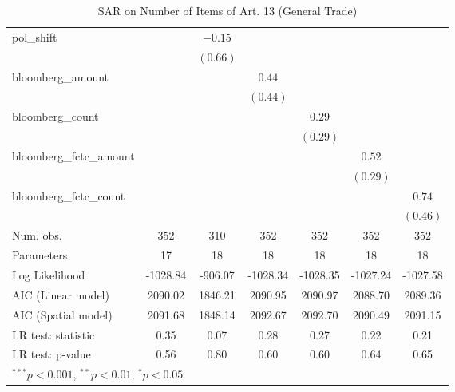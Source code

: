 \begin{table}[!h]
\begin{center}
\begin{tabular}{l c c c c c c }
pol\_shift              &              & $-0.15$      &              &              &              &              \\
                        &              & $(0.66)$     &              &              &              &              \\
bloomberg\_amount       &              &              & $0.44$       &              &              &              \\
                        &              &              & $(0.44)$     &              &              &              \\
bloomberg\_count        &              &              &              & $0.29$       &              &              \\
                        &              &              &              & $(0.29)$     &              &              \\
bloomberg\_fctc\_amount &              &              &              &              & $0.52$       &              \\
                        &              &              &              &              & $(0.29)$     &              \\
bloomberg\_fctc\_count  &              &              &              &              &              & $0.74$       \\
                        &              &              &              &              &              & $(0.46)$     \\
\midrule
Num. obs.               & 352          & 310          & 352          & 352          & 352          & 352          \\
Parameters              & 17           & 18           & 18           & 18           & 18           & 18           \\
Log Likelihood          & -1028.84     & -906.07      & -1028.34     & -1028.35     & -1027.24     & -1027.58     \\
AIC (Linear model)      & 2090.02      & 1846.21      & 2090.95      & 2090.97      & 2088.70      & 2089.36      \\
AIC (Spatial model)     & 2091.68      & 1848.14      & 2092.67      & 2092.70      & 2090.49      & 2091.15      \\
LR test: statistic      & 0.35         & 0.07         & 0.28         & 0.27         & 0.22         & 0.21         \\
LR test: p-value        & 0.56         & 0.80         & 0.60         & 0.60         & 0.64         & 0.65         \\
\bottomrule
\multicolumn{7}{l}{\scriptsize{$^{***}p<0.001$, $^{**}p<0.01$, $^*p<0.05$}}
\end{tabular}
\caption{SAR on Number of Items of Art. 13 (General Trade)}
\label{table:coefficients}
\end{center}
\end{table}
